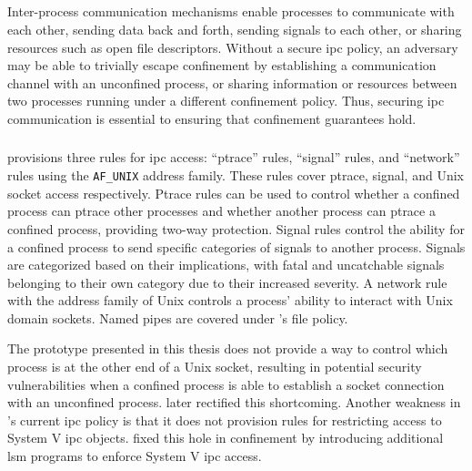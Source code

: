 \subsection{}

Inter-process communication mechanisms enable processes to communicate with each other,
sending data back and forth, sending signals to each other, or sharing resources such as
open file descriptors. Without a secure \gls{ipc} policy, an adversary may be able to
trivially escape confinement by establishing a communication channel with an unconfined
process, or sharing information or resources between two processes running under
a different confinement policy. Thus, securing \gls{ipc} communication is essential to
ensuring that confinement guarantees hold.

\subsubsection{\bpfbox{}}

\bpfbox{} provisions three rules for \gls{ipc} access: \enquote{ptrace} rules,
\enquote{signal} rules, and \enquote{network} rules using the \texttt{AF\_UNIX} address
family. These rules cover ptrace, signal, and Unix socket access respectively. Ptrace
rules can be used to control whether a confined process can ptrace other processes and
whether another process can ptrace a confined process, providing two-way protection.
Signal rules control the ability for a confined process to send specific categories of
signals to another process. Signals are categorized based on their implications, with
fatal and uncatchable signals belonging to their own category due to their increased
severity. A network rule with the address family of Unix controls a process' ability to interact
with Unix domain sockets. Named pipes are covered under \bpfbox{}'s file policy.

The \bpfbox{} prototype presented in this thesis does not provide a way to control which
process is at the other end of a Unix socket, resulting in potential security
vulnerabilities when a confined process is able to establish a socket connection with an
unconfined process. \bpfcontain{} later rectified this shortcoming.  Another weakness in
\bpfbox{}'s current \gls{ipc} policy is that it does not provision rules for restricting
access to System V \gls{ipc} objects. \bpfcontain{} fixed this hole in confinement by
introducing additional \gls{lsm} programs to enforce System V \gls{ipc} access.

